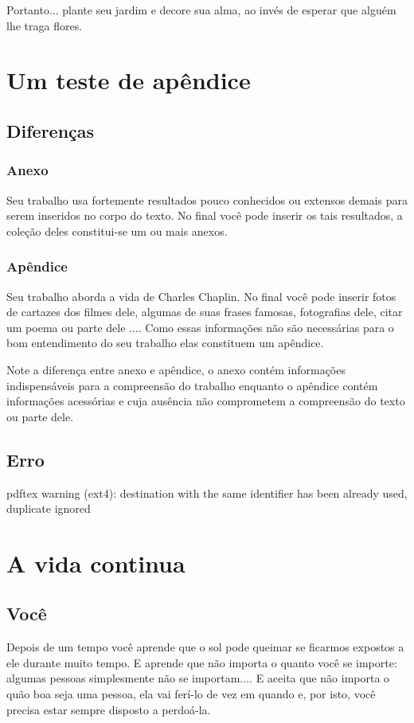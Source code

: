 Portanto$\ldots$ plante seu jardim e decore sua alma, ao invés de esperar que alguém lhe traga flores.


\apendice
\chapter{Um teste de apêndice}

\section{Diferenças}

\subsection{Anexo}
Seu trabalho usa fortemente resultados pouco conhecidos
ou extensos demais para serem inseridos no corpo do texto. No
final você pode inserir os tais resultados, a coleção deles
constitui-se um ou mais anexos.

\subsection{Apêndice}

Seu trabalho aborda a vida de Charles Chaplin. No final você
pode inserir fotos de cartazes dos filmes dele, algumas de suas 
frases famosas, fotografias dele, citar um poema ou parte dele $\ldots$. 
Como essas informações não são necessárias para o bom entendimento do 
seu trabalho elas constituem um apêndice.


Note a diferença entre anexo e apêndice, o anexo contém informações 
indispensáveis para a compreensão do trabalho enquanto o apêndice 
contém informações acessórias e cuja ausência não comprometem a 
compreensão do texto ou parte dele.

\section{Erro}
pdftex warning (ext4): destination with the same identifier has been already used, duplicate ignored


\chapter{A vida continua}
\section{Você}

Depois de um tempo você aprende que o sol pode queimar se ficarmos expostos a ele durante muito tempo. E aprende que não importa o quanto você se importe: algumas pessoas simplesmente não se importam$\ldots$. E aceita que não importa o quão boa seja uma pessoa, ela vai ferí-lo de vez em quando e, por isto, você precisa estar sempre disposto a perdoá-la.

